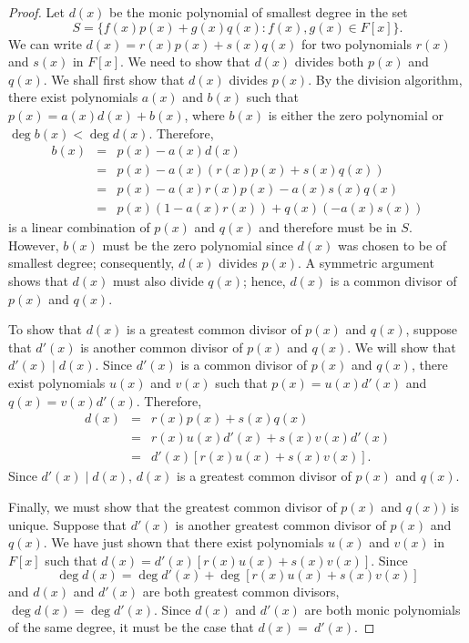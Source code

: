  
\begin{proof}
Let $d(x)$ be the monic polynomial of smallest degree in the set 
$$
S = \{ f(x) p(x) + g(x) q(x) : f(x), g(x) \in F[x]  \}.
$$
 We can write
$d(x) = r(x) p(x) + s(x) q(x)$ for two polynomials  $r(x)$ and $s(x)$
in $F[x]$. We need to show that $d(x)$ divides both $p(x)$ and $q(x)$.
We shall first show that $d(x)$ divides $p(x)$. By the division
algorithm, there exist polynomials $a(x)$ and $b(x)$ such that
$p(x) = a(x) d(x) + b(x)$, where $b(x)$ is either the
zero polynomial or $\deg b(x) < \deg d(x)$.  Therefore, 
\begin{eqnarray*}
b(x) & = & p(x) - a(x) d(x) \\
& = & p(x) - a(x)( r(x) p(x) + s(x) q(x))  \\
& = & p(x) - a(x) r(x) p(x) - a(x)  s(x) q(x) \\
& = & p(x)( 1  - a(x) r(x) ) + q(x) ( - a(x)  s(x) )
\end{eqnarray*}
is a linear combination of $p(x)$ and $q(x)$ and therefore must be in
$S$. However, $b(x)$ must be the zero polynomial since $d(x)$ was
chosen to be of smallest degree; consequently, $d(x)$ divides $p(x)$. 
A symmetric argument shows that $d(x)$ must also divide $q(x)$; hence,
$d(x)$ is a common divisor of $p(x)$ and $q(x)$. 
 
 
To show that $d(x)$ is a greatest common divisor of $p(x)$ and $q(x)$,
suppose that $d'(x)$ is another common divisor of $p(x)$ and $q(x)$.
We will show that $d'(x) \mid d(x)$.  Since $d'(x)$ is a common
divisor of $p(x)$ and $q(x)$, there exist polynomials $u(x)$ and
$v(x)$ such that $p(x) = u(x) d'(x)$ and $q(x) = v(x) d'(x)$.
Therefore, 
\begin{eqnarray*}
d(x) & = & r(x) p(x) + s(x) q(x) \\
& = &  r(x) u(x) d'(x) + s(x) v(x) d'(x) \\
& = & d'(x) [r(x) u(x) + s(x) v(x)].
\end{eqnarray*}
Since $d'(x) \mid d(x)$, $d(x)$ is a greatest common divisor of $p(x)$ 
and $q(x)$.
 
 
Finally, we must show that the greatest common divisor of $p(x)$ and
$q(x))$ is unique. Suppose that $d'(x)$ is another greatest common
divisor of $p(x)$ and $q(x)$. We have just shown that there exist
polynomials $u(x)$ and $v(x)$ in $F[x]$ such that $d(x) = d'(x)[r(x)
u(x) + s(x) v(x)]$. Since 
$$
\deg d(x) =  \deg d'(x) + \deg[r(x) u(x) + s(x) v(x)]
$$
and $d(x)$ and $d'(x)$ are both greatest common divisors, $\deg d(x) =
\deg d'(x)$. Since $d(x)$ and $d'(x)$ are both monic polynomials of
the same degree, it must be the case that $d(x) =~d'(x)$.
\end{proof}
 
